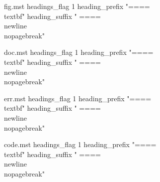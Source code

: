 \usepackage{etex}    %
{}  %

\usepackage{imakeidx} 


\makeindex[name=fig,intoc=false] %
\begin{filecontents*}{fig.mst}
headings_flag 1
heading_prefix "{==== \\textbf{"
heading_suffix " ====\\newline}}\\nopagebreak\n"
\end{filecontents*}

\makeindex[name=doc,intoc=false] %
\begin{filecontents*}{doc.mst}
headings_flag 1
heading_prefix "{==== \\textbf{"
heading_suffix " ====\\newline}}\\nopagebreak\n"
\end{filecontents*}

\makeindex[name=err,intoc=false] %
\begin{filecontents*}{err.mst}
headings_flag 1
heading_prefix "{==== \\textbf{"
heading_suffix " ====\\newline}}\\nopagebreak\n"
\end{filecontents*}

\makeindex[name=code,intoc=false] %
\begin{filecontents*}{code.mst}
headings_flag 1
heading_prefix "{==== \\textbf{"
heading_suffix " ====\\newline}}\\nopagebreak\n"
\end{filecontents*}

